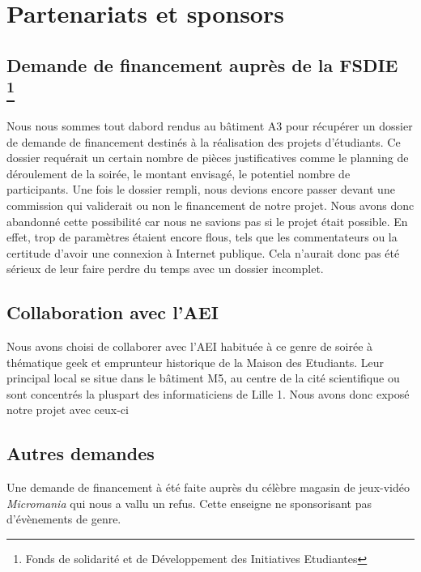 \section{Partenariats et sponsors}%
\label{sec:partenariats_et_sponsors}

\subsection{Demande de financement auprès de la FSDIE\, \footnote{Fonds de solidarité%
et de Développement des Initiatives Etudiantes}}
\label{sub:demande_de_financement_aupr_s_de_la_fsdie}

Nous nous sommes tout dabord rendus au bâtiment A3 pour récupérer un
dossier de demande de financement destinés à la réalisation des projets d'étudiants.
Ce dossier requérait un certain nombre de pièces justificatives comme le
planning de déroulement de la soirée, le montant envisagé, le potentiel
nombre de participants. Une fois le dossier rempli, nous devions encore passer devant
une commission qui validerait ou non le financement de notre projet. Nous avons donc
abandonné cette possibilité car nous ne savions pas si le projet était
possible. En effet, trop de paramètres étaient encore flous, tels que les commentateurs
ou la certitude d'avoir une connexion à Internet publique. Cela n'aurait donc pas été
sérieux de leur faire perdre du temps avec un dossier incomplet.

\subsection{Collaboration avec l'AEI}%
\label{sub:collaboration_avec_l_aei}

Nous avons choisi de collaborer avec l'AEI habituée à ce genre de soirée
à thématique \og geek \fg{} et
emprunteur historique de la Maison des Etudiants.
Leur principal local se situe dans le bâtiment M5, au centre de la
cité scientifique ou sont concentrés la pluspart des informaticiens de
Lille 1.
Nous avons donc exposé notre projet avec ceux-ci

\subsection{Autres demandes}%
\label{sub:autres_demandes}

Une demande de financement à été faite auprès du célèbre magasin de
jeux-vidéo \emph{Micromania} qui nous a vallu un refus. Cette
enseigne ne sponsorisant pas d'évènements de genre.

